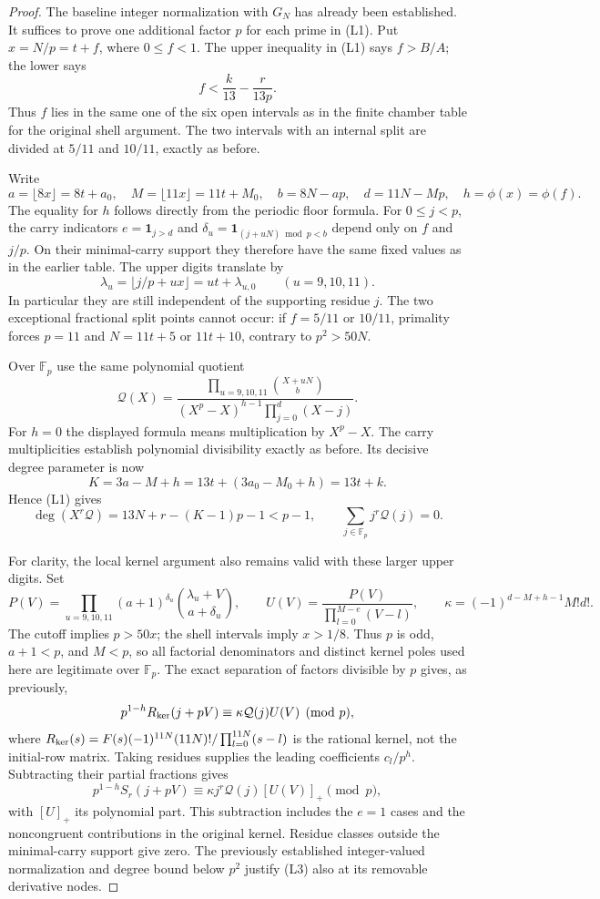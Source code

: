 \begin{proof}
The baseline integer normalization with $G_N$ has already been established.
It suffices to prove one additional factor $p$ for each prime in (L1).
Put $x=N/p=t+f$, where $0\le f<1$. The upper inequality in (L1) says
$f>B/A$; the lower says
\[
 f<\frac{k}{13}-\frac{r}{13p}.
\]
Thus $f$ lies in the same one of the six open intervals as in the
finite chamber table for the original shell argument.
The two intervals with an internal split are divided at $5/11$ and
$10/11$, exactly as before.

Write
\[
 a=\lfloor8x\rfloor=8t+a_0,\quad
 M=\lfloor11x\rfloor=11t+M_0,\quad
 b=8N-ap,\quad d=11N-Mp,\quad h=\phi(x)=\phi(f).
\]
The equality for $h$ follows directly from the periodic floor formula.
For $0\le j<p$, the carry indicators $e=\mathbf1_{j>d}$ and
$\delta_u=\mathbf1_{(j+uN)\bmod p<b}$ depend only on $f$ and $j/p$.
On their minimal-carry support they therefore have the same fixed
values as in the earlier table. The upper digits translate by
\[
 \lambda_u=\lfloor j/p+ux\rfloor=ut+\lambda_{u,0}
 \qquad (u=9,10,11).
\]
In particular they are still independent of the supporting residue $j$.
The two exceptional fractional split points cannot occur: if
$f=5/11$ or $10/11$, primality forces $p=11$ and
$N=11t+5$ or $11t+10$, contrary to $p^2>50N$.

Over $\mathbb F_p$ use the same polynomial quotient
\[
 \mathcal Q(X)=
 \frac{\prod_{u=9,10,11}\binom{X+uN}{b}}
 {(X^p-X)^{h-1}\prod_{j=0}^d(X-j)}.
\]
For $h=0$ the displayed formula means multiplication by $X^p-X$.
The carry multiplicities establish polynomial divisibility exactly as
before. Its decisive degree parameter is now
\[
 K=3a-M+h=13t+(3a_0-M_0+h)=13t+k.
\]
Hence (L1) gives
\[
 \deg(X^r\mathcal Q)=13N+r-(K-1)p-1<p-1,
 \qquad \sum_{j\in\mathbb F_p}j^r\mathcal Q(j)=0.
 \tag{L2}
\]

For clarity, the local kernel argument also remains valid with these
larger upper digits. Set
\[
 P(V)=\prod_{u=9,10,11}(a+1)^{\delta_u}
              \binom{\lambda_u+V}{a+\delta_u},\qquad
 U(V)=\frac{P(V)}{\prod_{l=0}^{M-e}(V-l)},\qquad
 \kappa=(-1)^{d-M+h-1}M!d!.
\]
The cutoff implies $p>50x$; the shell intervals imply $x>1/8$.
Thus $p$ is odd, $a+1<p$, and $M<p$, so all factorial denominators
and distinct kernel poles used here are legitimate over $\mathbb F_p$.
The exact separation of factors divisible by $p$ gives, as previously,
\[
 p^{1-h}R_{\rm ker}(j+pV)
       \equiv\kappa\mathcal Q(j)U(V)\pmod p,
\]
where $R_{\rm ker}(s)=F(s)(-1)^{11N}(11N)!/
\prod_{l=0}^{11N}(s-l)$ is the rational kernel, not the initial-row matrix.
Taking residues supplies the leading coefficients $c_l/p^h$.
Subtracting their partial fractions gives
\[
 p^{1-h}S_r(j+pV)
       \equiv\kappa j^r\mathcal Q(j)[U(V)]_+\pmod p,
 \tag{L3}
\]
with $[U]_+$ its polynomial part. This subtraction includes the
$e=1$ cases and the noncongruent contributions in the original
kernel. Residue classes outside the minimal-carry support give zero.
The previously established integer-valued normalization and degree
bound below $p^2$ justify (L3) also at its removable derivative nodes.


\end{proof}
